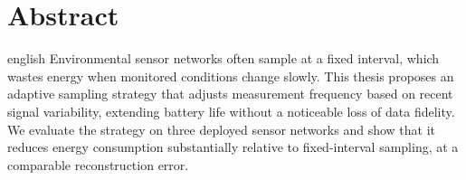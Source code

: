 \chapter*{Abstract}
\label{chap-abstract}

\begin{otherlanguage*}{english}
Environmental sensor networks often sample at a fixed interval, which
wastes energy when monitored conditions change slowly. This thesis proposes
an adaptive sampling strategy that adjusts measurement frequency based on
recent signal variability, extending battery life without a noticeable
loss of data fidelity. We evaluate the strategy on three deployed sensor
networks and show that it reduces energy consumption substantially relative
to fixed-interval sampling, at a comparable reconstruction error.
\end{otherlanguage*}
